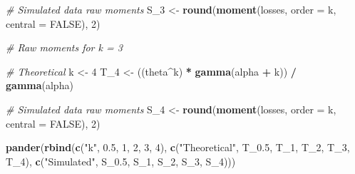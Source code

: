 \documentclass[]{book}
\newenvironment{Shaded}{\begin{snugshade}}{\end{snugshade}}
\newcommand{\KeywordTok}[1]{\textcolor[rgb]{0.13,0.29,0.53}{\textbf{#1}}}
\newcommand{\DataTypeTok}[1]{\textcolor[rgb]{0.13,0.29,0.53}{#1}}
\newcommand{\DecValTok}[1]{\textcolor[rgb]{0.00,0.00,0.81}{#1}}
\newcommand{\FloatTok}[1]{\textcolor[rgb]{0.00,0.00,0.81}{#1}}
\newcommand{\StringTok}[1]{\textcolor[rgb]{0.31,0.60,0.02}{#1}}
\newcommand{\CommentTok}[1]{\textcolor[rgb]{0.56,0.35,0.01}{\textit{#1}}}
\newcommand{\OtherTok}[1]{\textcolor[rgb]{0.56,0.35,0.01}{#1}}
\newcommand{\OperatorTok}[1]{\textcolor[rgb]{0.81,0.36,0.00}{\textbf{#1}}}
\newcommand{\NormalTok}[1]{#1}
\theoremstyle{definition}
\theoremstyle{definition}
\theoremstyle{definition}
\theoremstyle{remark}
\begin{document}
\begin{Shaded}
\begin{Highlighting}[]
\CommentTok{# Simulated data raw moments}
\NormalTok{S_}\DecValTok{3}\NormalTok{ <-}\StringTok{ }\KeywordTok{round}\NormalTok{(}\KeywordTok{moment}\NormalTok{(losses, }\DataTypeTok{order =}\NormalTok{ k, }\DataTypeTok{central =} \OtherTok{FALSE}\NormalTok{), }\DecValTok{2}\NormalTok{)}

\CommentTok{# Raw moments for k = 3}

\CommentTok{# Theoretical }
\NormalTok{k <-}\StringTok{ }\DecValTok{4}
\NormalTok{T_}\DecValTok{4}\NormalTok{ <-}\StringTok{ }\NormalTok{((theta}\OperatorTok{^}\NormalTok{k) }\OperatorTok{*}\StringTok{ }\KeywordTok{gamma}\NormalTok{(alpha }\OperatorTok{+}\StringTok{ }\NormalTok{k)) }\OperatorTok{/}\StringTok{ }\KeywordTok{gamma}\NormalTok{(alpha)}

\CommentTok{# Simulated data raw moments}
\NormalTok{S_}\DecValTok{4}\NormalTok{ <-}\StringTok{ }\KeywordTok{round}\NormalTok{(}\KeywordTok{moment}\NormalTok{(losses, }\DataTypeTok{order =}\NormalTok{ k, }\DataTypeTok{central =} \OtherTok{FALSE}\NormalTok{), }\DecValTok{2}\NormalTok{)}

\KeywordTok{pander}\NormalTok{(}\KeywordTok{rbind}\NormalTok{(}\KeywordTok{c}\NormalTok{(}\StringTok{"k"}\NormalTok{, }\FloatTok{0.5}\NormalTok{, }\DecValTok{1}\NormalTok{, }\DecValTok{2}\NormalTok{, }\DecValTok{3}\NormalTok{, }\DecValTok{4}\NormalTok{), }\KeywordTok{c}\NormalTok{(}\StringTok{"Theoretical"}\NormalTok{, T_}\FloatTok{0.5}\NormalTok{, T_}\DecValTok{1}\NormalTok{, T_}\DecValTok{2}\NormalTok{, T_}\DecValTok{3}\NormalTok{, T_}\DecValTok{4}\NormalTok{), }
             \KeywordTok{c}\NormalTok{(}\StringTok{"Simulated"}\NormalTok{, S_}\FloatTok{0.5}\NormalTok{, S_}\DecValTok{1}\NormalTok{, S_}\DecValTok{2}\NormalTok{, S_}\DecValTok{3}\NormalTok{, S_}\DecValTok{4}\NormalTok{)))}
\end{Highlighting}
\end{Shaded}
\end{document}
